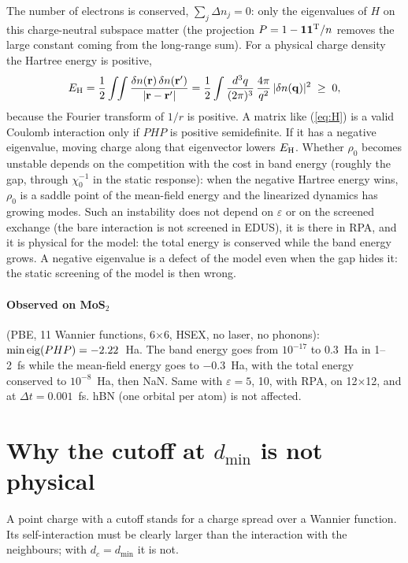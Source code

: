 \documentclass[11pt]{article}
\newcommand{\Dn}{\Delta n}
\begin{document}
The number of electrons is conserved, $\sum_j\Dn_j = 0$: only the eigenvalues of $H$ on this charge-neutral subspace
matter (the projection $P = 1 - \mathbf 1\mathbf 1^{\rm T}/n$ removes the large constant coming from the long-range
sum). For a physical charge density the Hartree energy is positive,
\[
E_{\rm H} = \frac12\int\!\!\int \frac{\delta n(\mathbf r)\,\delta n(\mathbf r')}{|\mathbf r-\mathbf r'|}
          = \frac12\int\frac{d^3q}{(2\pi)^3}\,\frac{4\pi}{q^2}\,|\delta n(\mathbf q)|^2 \;\ge\; 0,
\]
because the Fourier transform of $1/r$ is positive. A matrix like (\ref{eq:H}) is a valid Coulomb interaction only if
$PHP$ is positive semidefinite. If it has a negative eigenvalue, moving charge along that eigenvector lowers
$E_{\rm H}$. Whether $\rho_0$ becomes unstable depends on the competition with the cost in band energy (roughly the
gap, through $\chi_0^{-1}$ in the static response): when the negative Hartree energy wins, $\rho_0$ is a saddle point
of the mean-field energy and the linearized dynamics has growing modes. Such an instability does not depend on
$\varepsilon$ or on the screened exchange (the bare interaction is not screened in EDUS), it is there in RPA, and it is
physical for the model: the total energy is conserved while the band energy grows. A negative eigenvalue is a defect
of the model even when the gap hides it: the static screening of the model is then wrong.

\paragraph{Observed on MoS$_2$} (PBE, 11 Wannier functions, 6$\times$6, HSEX, no laser, no phonons):
$\min{\rm eig}(PHP) = -2.22$~Ha. The band energy goes from $10^{-17}$ to $0.3$~Ha in 1--2~fs while the mean-field
energy goes to $-0.3$~Ha, with the total energy conserved to $10^{-8}$~Ha, then NaN. Same with $\varepsilon = 5$, 10,
with RPA, on 12$\times$12, and at $\Delta t = 0.001$~fs. hBN (one orbital per atom) is not affected.

\section{Why the cutoff at $d_{\min}$ is not physical}

A point charge with a cutoff stands for a charge spread over a Wannier function. Its self-interaction must be clearly
larger than the interaction with the neighbours; with $d_c = d_{\min}$ it is not.
\end{document}
